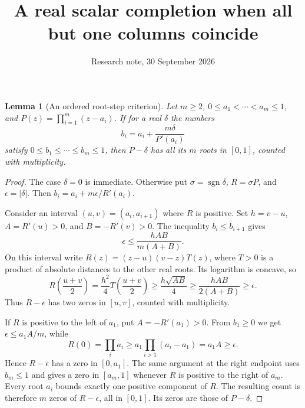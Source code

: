 \documentclass[11pt]{article}
\title{A real scalar completion when all but one columns coincide}
\author{Research note, 30 September 2026}
\date{}
\newtheorem{lemma}{Lemma}
\begin{document}
\maketitle

\begin{lemma}[An ordered root-step criterion]\label{roots}
Let $m\ge2$, $0\le a_1<\cdots<a_m\le1$, and
$P(z)=\prod_{i=1}^m(z-a_i)$. If for a real $\delta$ the numbers
\[
 b_i=a_i+\frac{m\delta}{P'(a_i)}
\]
satisfy $0\le b_1\le\cdots\le b_m\le1$, then $P-\delta$ has
all its $m$ roots in $[0,1]$, counted with multiplicity.
\end{lemma}
\begin{proof}
The case $\delta=0$ is immediate. Otherwise put
$\sigma=\operatorname{sgn}\delta$, $R=\sigma P$, and
$\epsilon=|\delta|$. Then $b_i=a_i+m\epsilon/R'(a_i)$.

Consider an interval $(u,v)=(a_i,a_{i+1})$ where $R$ is positive.
Set $h=v-u$, $A=R'(u)>0$, and $B=-R'(v)>0$.
The inequality $b_i\le b_{i+1}$ gives
\[
 \epsilon\le\frac{hAB}{m(A+B)}.
\]
On this interval write $R(z)=(z-u)(v-z)T(z)$, where $T>0$ is a
product of absolute distances to the other real roots. Its logarithm
is concave, so
\[
 R\left(\frac{u+v}{2}\right)
 =\frac{h^2}{4}T\left(\frac{u+v}{2}\right)
 \ge\frac{h\sqrt{AB}}4
 \ge\frac{hAB}{2(A+B)}
 \ge\epsilon.
\]
Thus $R-\epsilon$ has two zeros in $[u,v]$, counted with multiplicity.

If $R$ is positive to the left of $a_1$, put $A=-R'(a_1)>0$.
From $b_1\ge0$ we get $\epsilon\le a_1A/m$, while
\[
 R(0)=\prod_i a_i
 \ge a_1\prod_{i>1}(a_i-a_1)=a_1A\ge\epsilon.
\]
Hence $R-\epsilon$ has a zero in $[0,a_1]$.
The same argument at the right endpoint uses $b_m\le1$ and gives a
zero in $[a_m,1]$ whenever $R$ is positive to the right of $a_m$.
Every root $a_i$ bounds exactly one positive component of $R$.
The resulting count is therefore $m$ zeros of $R-\epsilon$, all in
$[0,1]$. Its zeros are those of $P-\delta$.
\end{proof}
\end{document}
